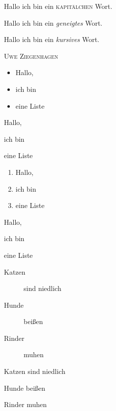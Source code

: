 \documentclass[15pt,ngerman]{scrreprt}
\newcommand{\person}[1]{\textsc{#1}}
\begin{document}
Hallo ich bin ein \textsc{kapitälchen} Wort.

Hallo ich bin ein \textsl{geneigtes} Wort.

Hallo ich bin ein \textit{kursives} Wort.

\person{Uwe Ziegenhagen}

\begin{itemize}[\(\cup\)]
\item Hallo,
\item ich bin
\item eine Liste
\end{itemize}

\begin{compactitem}
\item Hallo,
\item ich bin
\item eine Liste
\end{compactitem}

\begin{enumerate}
\item Hallo,
\item ich bin
\item eine Liste
\end{enumerate}

\begin{compactenum}
\item Hallo,
\item ich bin
\item eine Liste
\end{compactenum}


\begin{description}
\item [Katzen] sind niedlich
\item [Hunde] beißen
\item [Rinder] muhen
\end{description}


\begin{compactdesc}
\item [Katzen] sind niedlich
\item [Hunde] beißen
\item [Rinder] muhen
\end{compactdesc}
\end{document}
